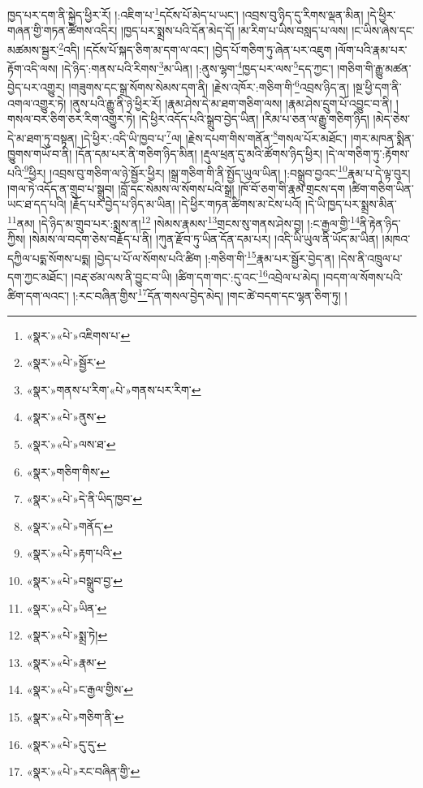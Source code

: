ཁྱད་པར་དག་ནི་སྐྱེད་ཕྱིར་རོ། །:འཇིག་པ་\footnote{«སྣར་»«པེ་»འཇིགས་པ་}དངོས་པོ་མེད་པ་ཡང་། །འབྲས་བུ་ཉིད་དུ་རིགས་ལྡན་མིན། །དེ་ཕྱིར་གཞན་གྱི་གཏན་ཚིགས་འདིར། །ཁྱད་པར་སྨྲས་པའི་དོན་མེད་དོ། །མ་རིག་པ་ཡིས་བསླད་པ་ལས། །ང་ཡིས་ཞེས་དང་མཚམས་སྦྱར་\footnote{«སྣར་»«པེ་»སྦྱོར་}འདི། །དངོས་པོ་སྐད་ཅིག་མ་དག་ལ་འང་། །བྱེད་པོ་གཅིག་ཏུ་ཞེན་པར་འཇུག །ལོག་པའི་རྣམ་པར་རྟོག་འདི་ལས། །དེ་ཉིད་:གནས་པའི་རིགས་\footnote{«སྣར་»གནས་པ་རིག་«པེ་»གནས་པར་རིག་}མ་ཡིན། །:ནུས་ལྷག་\footnote{«སྣར་»«པེ་»ནུས་}ཁྱད་པར་ལས་\footnote{«སྣར་»«པེ་»ལས་ཐ་}དད་ཀྱང་། །གཅིག་གི་རྒྱུ་མཚན་བྱེད་པར་འགྱུར། །གཟུགས་དང་སྒྲ་སོགས་སེམས་དག་ནི། །རྗེས་འཁོར་:གཅིག་གི་\footnote{«སྣར་»གཅིག་གིས་}འབྲས་ཉིད་ན། །སྔ་ཕྱི་དག་ནི་འགལ་འགྱུར་ཏེ། །ནུས་པའི་རྒྱུ་ནི་ཉེ་ཕྱིར་རོ། །རྣམ་ཤེས་དེ་མ་ཐག་གཅིག་ལས། །རྣམ་ཤེས་དྲུག་པོ་འབྱུང་བ་ནི། །གསལ་བར་ཅིག་ཅར་རིག་འགྱུར་ཏེ། །དེ་ཕྱིར་འདོད་པའི་སྒྲུབ་བྱེད་ཡིན། །རིམ་པ་ཅན་ལ་རྒྱུ་གཅིག་ཉིད། །མེད་ཅེས་དེ་མ་ཐག་ཏུ་བསྟན། །དེ་ཕྱིར་:འདི་ཡི་ཁྱབ་པ་\footnote{«སྣར་»«པེ་»དེ་ནི་ཡིད་ཁྱབ་}ལ། །རྗེས་དཔག་གིས་གནོན་\footnote{«སྣར་»«པེ་»གནོད་}གསལ་པོར་མཐོང་། །གར་མཁན་སྨིན་ཁྱུགས་གཡོ་བ་ནི། །དོན་དམ་པར་ནི་གཅིག་ཉིད་མིན། །རྡུལ་ཕྲན་དུ་མའི་ཚོགས་ཉིད་ཕྱིར། །དེ་ལ་གཅིག་ཏུ་:རྟོགས་པའི་\footnote{«སྣར་»«པེ་»རྟག་པའི་}ཕྱིར། །འབྲས་བུ་གཅིག་ལ་ཉེ་སྦྱོར་ཕྱིར། །སྒྲ་གཅིག་གི་ནི་སྤྱོད་ཡུལ་ཡིན། །:བསྒྲུབ་བྱའང་\footnote{«སྣར་»«པེ་»བསྒྲུབ་བྱ་}རྣམ་པ་དེ་ལྟ་བུར། །གལ་ཏེ་འདོད་ན་གྲུབ་པ་སྒྲུབ། །བློ་དང་སེམས་ལ་སོགས་པའི་སྒྲ། །ཁོ་བོ་ཅག་གི་རྣམ་གྲངས་དག །ཚིག་གཅིག་ཡིན་ཡང་ཐ་དད་པའི། །རྗོད་པར་བྱེད་པ་ཉིད་མ་ཡིན། །དེ་ཕྱིར་གཏན་ཚིགས་མ་ངེས་པའོ། །དེ་ཡི་ཁྱད་པར་སྨྲས་མིན་\footnote{«སྣར་»«པེ་»ཡིན་}ནམ། །དེ་ཉིད་མ་གྲུབ་པར་:སྨྲས་ན།\footnote{«སྣར་»«པེ་»སྨྲ་ཏེ།} །སེམས་རྣམས་\footnote{«སྣར་»«པེ་»རྣམ་}གྲངས་སུ་གནས་ཤེས་བྱ། །:ང་རྒྱལ་གྱི་\footnote{«སྣར་»«པེ་»ང་རྒྱལ་གྱིས་}ནི་རྟེན་ཉིད་ཀྱིས། །སེམས་ལ་བདག་ཅེས་བརྗོད་པ་ནི། །ཀུན་རྫོབ་ཏུ་ཡིན་དོན་དམ་པར། །འདི་ཡི་ཡུལ་ནི་ཡོད་མ་ཡིན། །མཁའ་དཀྱིལ་པདྨ་སོགས་པདྨ། །བྱེད་པ་པོ་ལ་སོགས་པའི་ཚིག །:གཅིག་གི་\footnote{«སྣར་»«པེ་»གཅིག་ནི་}རྣམ་པར་སྦྱོར་བྱེད་ན། །དེས་ནི་འཁྲུལ་པ་དག་ཀྱང་མཐོང་། །བརྡ་ཙམ་ལས་ནི་བྱུང་བ་ཡི། །ཚིག་དག་གང་:དུ་འང་\footnote{«སྣར་»«པེ་»དུ་དུ་}འབྲེལ་པ་མེད། །བདག་ལ་སོགས་པའི་ཚིག་དག་ལའང་། །:རང་བཞིན་གྱིས་\footnote{«སྣར་»«པེ་»རང་བཞིན་གྱི་}དོན་གསལ་བྱེད་མེད། །གང་ཚེ་བདག་དང་ལྷན་ཅིག་ཏུ། །
